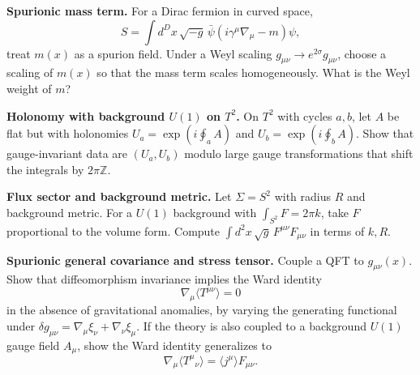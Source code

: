 \begin{problem}
    \textbf{Spurionic mass term.} For a Dirac fermion in curved space,
    \[
        S=\int d^Dx\,\sqrt{-g}\,\bar{\psi}(i\gamma^\mu\nabla_\mu-m)\psi,
    \]
    treat \(m(x)\) as a spurion field. Under a Weyl scaling \(g_{\mu\nu}\to e^{2\sigma}g_{\mu\nu}\), choose a scaling of \(m(x)\) so that the mass term scales homogeneously. What is the Weyl weight of \(m\)?
\end{problem}
\begin{problem}
    \textbf{Holonomy with background \(U(1)\) on \(T^2\).} On \(T^2\) with cycles \(a,b\), let \(A\) be flat but with holonomies \(U_a=\exp(i\oint_a A)\) and \(U_b=\exp(i\oint_b A)\). Show that gauge-invariant data are \((U_a,U_b)\) modulo large gauge transformations that shift the integrals by \(2\pi\mathbb{Z}\).
\end{problem}
\begin{problem}
    \textbf{Flux sector and background metric.} Let \(\Sigma=S^2\) with radius \(R\) and background metric. For a \(U(1)\) background with \(\int_{S^2}F=2\pi k\), take \(F\) proportional to the volume form. Compute \(\int d^2x\,\sqrt{g}\,F^{\mu\nu}F_{\mu\nu}\) in terms of \(k,R\).
\end{problem}
\begin{problem}
    \textbf{Spurionic general covariance and stress tensor.} Couple a QFT to \(g_{\mu\nu}(x)\). Show that diffeomorphism invariance implies the Ward identity
    \[
        \nabla_\mu\langle T^{\mu\nu}\rangle=0
    \]
    in the absence of gravitational anomalies, by varying the generating functional under \(\delta g_{\mu\nu}=\nabla_\mu\xi_\nu+\nabla_\nu\xi_\mu\). If the theory is also coupled to a background \(U(1)\) gauge field \(A_\mu\), show the Ward identity generalizes to
    \[
        \nabla_\mu\langle T^\mu{}_\nu\rangle=\langle j^\mu\rangle F_{\mu\nu}.
    \]
\end{problem}
